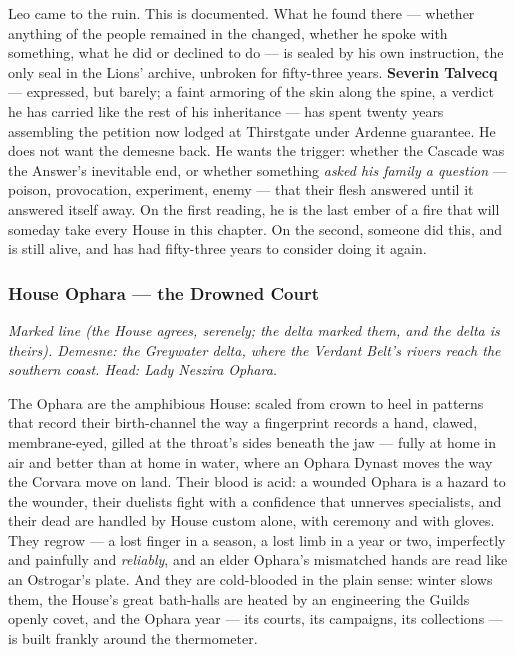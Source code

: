 Leo came to the ruin. This is documented. What he found there --- whether anything of the people remained in the changed, whether he spoke with something, what he did or declined to do --- is sealed by his own instruction, the only seal in the Lions' archive, unbroken for fifty-three years. \textbf{Severin Talvecq} --- expressed, but barely; a faint armoring of the skin along the spine, a verdict he has carried like the rest of his inheritance --- has spent twenty years assembling the petition now lodged at Thirstgate under Ardenne guarantee. He does not want the demesne back. He wants the trigger: whether the Cascade was the Answer's inevitable end, or whether something \textit{asked his family a question} --- poison, provocation, experiment, enemy --- that their flesh answered until it answered itself away. On the first reading, he is the last ember of a fire that will someday take every House in this chapter. On the second, someone did this, and is still alive, and has had fifty-three years to consider doing it again.

\subsubsection{House Ophara --- the Drowned Court}

\textit{Marked line (the House agrees, serenely; the delta marked them, and the delta is theirs). Demesne: the Greywater delta, where the Verdant Belt's rivers reach the southern coast. Head: Lady Neszira Ophara.}

The Ophara are the amphibious House: scaled from crown to heel in patterns that record their birth-channel the way a fingerprint records a hand, clawed, membrane-eyed, gilled at the throat's sides beneath the jaw --- fully at home in air and better than at home in water, where an Ophara Dynast moves the way the Corvara move on land. Their blood is acid: a wounded Ophara is a hazard to the wounder, their duelists fight with a confidence that unnerves specialists, and their dead are handled by House custom alone, with ceremony and with gloves. They regrow --- a lost finger in a season, a lost limb in a year or two, imperfectly and painfully and \textit{reliably}, and an elder Ophara's mismatched hands are read like an Ostrogar's plate. And they are cold-blooded in the plain sense: winter slows them, the House's great bath-halls are heated by an engineering the Guilds openly covet, and the Ophara year --- its courts, its campaigns, its collections --- is built frankly around the thermometer.

